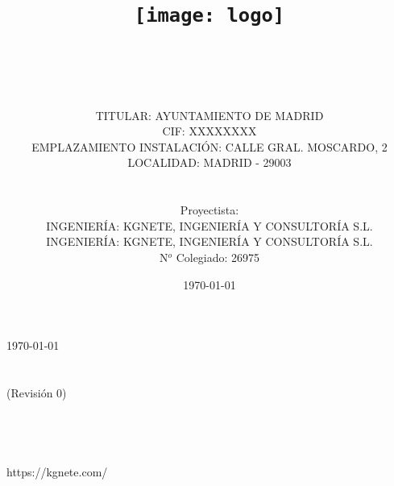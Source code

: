 \documentclass{report}
\title{\texttt{[image: logo]} \\ \proyectotitulo \\ \proyectosubtitulo }
\author{
\\
\vspace{2cm} \\
TITULAR: AYUNTAMIENTO DE MADRID \\
CIF: XXXXXXXX \\
EMPLAZAMIENTO INSTALACIÓN: CALLE GRAL. MOSCARDO, 2 \\
LOCALIDAD: MADRID - 29003  \\
\\
\vspace{2cm} \\
Proyectista: \proyectosubtitulo \\
INGENIERÍA: KGNETE, INGENIERÍA Y CONSULTORÍA S.L. \\
INGENIERÍA: KGNETE, INGENIERÍA Y CONSULTORÍA S.L. \\
N$^o$ Colegiado: 26975
\vspace{2cm} \\
}
\date{\today}
\newcommand{\path}{../../../assets/settings}
\begin{document}
\maketitle
\tableofcontents







% 






\newpage



\vspace{15cm}
\hspace{8cm}
\begin{minipage}{11cm}
    {
        \today \\ 
        \proyectotitulo \\
        \proyectosubtitulo \\ 
        (Revisión 0) \\ \\
        \proyectistanombre \\ \\
    
     \\
    https://kgnete.com/
    }
\end{minipage}
\end{document}
